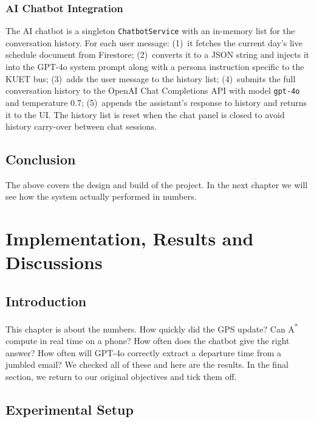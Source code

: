 \documentclass[12pt,a4paper]{report}
\begin{document}
\subsection{AI Chatbot Integration}

The AI chatbot is a singleton \texttt{ChatbotService} with an in-memory list for the conversation history. For each user message: (1)~it fetches the current day's live schedule document from Firestore; (2)~converts it to a JSON string and injects it into the GPT-4o system prompt along with a persona instruction specific to the KUET bus; (3)~adds the user message to the history list; (4)~submits the full conversation history to the OpenAI Chat Completions API with model \texttt{gpt-4o} and temperature 0.7; (5)~appends the assistant's response to history and returns it to the UI. The history list is reset when the chat panel is closed to avoid history carry-over between chat sessions.

\section{Conclusion}

The above covers the design and build of the project. In the next chapter we will see how the system actually performed in numbers.

\chapter{Implementation, Results and Discussions}

\section{Introduction}

This chapter is about the numbers. How quickly did the GPS update? Can A\textsuperscript{*} compute in real time on a phone? How often does the chatbot give the right answer? How often will GPT-4o correctly extract a departure time from a jumbled email? We checked all of these and here are the results. In the final section, we return to our original objectives and tick them off.

\section{Experimental Setup}
\end{document}
